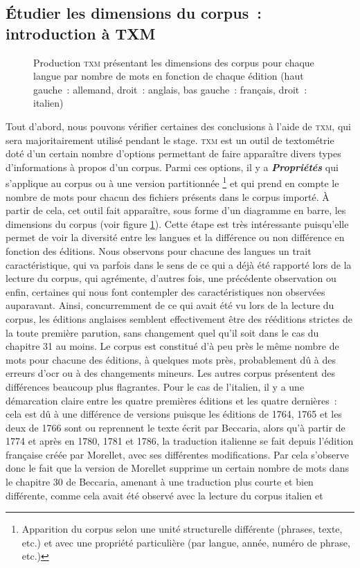 \subsection{Étudier les dimensions du corpus~: introduction à TXM}
\begin{figure}[t]
    \centering
    \caption{Production \textsc{txm} présentant les dimensions des corpus pour chaque langue par nombre de mots en fonction de chaque édition (haut gauche~: allemand, droit~: anglais, bas gauche~: français, droit~: italien)}
    \label{fig:dimensions}
\end{figure}
Tout d'abord, nous pouvons vérifier certaines des conclusions à l'aide de \textsc{txm}, qui sera majoritairement utilisé pendant le stage. \textsc{txm} est un outil de textométrie doté d'un certain nombre d'options permettant de faire apparaître divers types d'informations à propos d'un corpus. Parmi ces options, il y a \textbf{\textit{Propriétés}} qui s'applique au corpus ou à une version partitionnée \footnote{Apparition du corpus selon une unité structurelle différente (phrases, texte, etc.) et avec une propriété particulière (par langue, année, numéro de phrase, etc.)} et qui prend en compte le nombre de mots pour chacun des fichiers présents dans le corpus importé. À partir de cela, cet outil fait apparaître, sous forme d'un diagramme en barre, les dimensions du corpus (voir figure \ref{fig:dimensions}). Cette étape est très intéressante puisqu'elle permet de voir la diversité entre les langues et la différence ou non différence en fonction des éditions. Nous observons pour chacune des langues un trait caractéristique, qui va parfois dans le sens de ce qui a déjà été rapporté lors de la lecture du corpus, qui agrémente, d'autres fois, une précédente observation ou enfin, certaines qui nous font contempler des caractéristiques non observées auparavant. Ainsi, concurremment de ce qui avait été vu lors de la lecture du corpus, les éditions anglaises semblent effectivement être des rééditions strictes de la toute première parution, sans changement quel qu'il soit dans le cas du chapitre 31 au moins. Le corpus est constitué d'à peu près le même nombre de mots pour chacune des éditions, à quelques mots près, probablement dû à des erreurs d'\acrshort{ocr} ou à des changements mineurs. Les autres corpus présentent des différences beaucoup plus flagrantes. Pour le cas de l'italien, il y a une démarcation claire entre les quatre premières éditions et les quatre dernières~: cela est dû à une différence de versions puisque les éditions de 1764, 1765 et les deux de 1766 sont ou reprennent le texte écrit par Beccaria, alors qu'à partir de 1774 et après en 1780, 1781 et 1786, la traduction italienne se fait depuis l'édition française créée par Morellet, avec ses différentes modifications. Par cela s'observe donc le fait que la version de Morellet supprime un certain nombre de mots dans le chapitre 30 de Beccaria, amenant à une traduction plus courte et bien différente, comme cela avait été observé avec la lecture du corpus italien et 